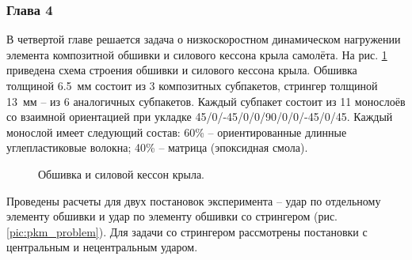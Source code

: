 
\subsubsection*{Глава 4}

В четвертой главе решается задача о низкоскоростном динамическом нагружении элемента композитной обшивки и силового кессона крыла самолёта. На рис. \ref{pic:construction} приведена схема строения обшивки и силового кессона крыла. Обшивка толщиной 6.5~мм состоит из 3 композитных субпакетов, стрингер толщиной 13~мм -- из 6 аналогичных субпакетов. Каждый субпакет состоит из 11 монослоёв со взаимной ориентацией при укладке 45/0/-45/0/0/90/0/0/-45/0/45. Каждый монослой имеет следующий состав: 60\% -- ориентированные длинные углепластиковые волокна; 40\% -- матрица (эпоксидная смола). 


\begin{figure}[htp]
\caption{Обшивка и силовой кессон крыла.}
\label{pic:construction}
\end{figure}

Проведены расчеты для двух постановок эксперимента -- удар по отдельному элементу обшивки и удар по элементу обшивки со стрингером (рис. \ref{pic:pkm_problem}). Для задачи со стрингером рассмотрены постановки с центральным и нецентральным ударом.

